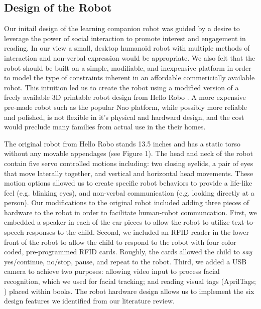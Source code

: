 \documentclass{sigchi}
\begin{document}
\subsection{Design of the Robot}
Our initail design of the learning companion robot was guided by a desire to leverage the power of social interaction to promote interest and engagement in reading.  In our view a small, desktop humanoid robot with multiple methods of interaction and non-verbal expression would be appropriate.  We also felt that the robot should be built on a simple, modifiable, and inexpensive platform in order to model the type of constraints inherent in an affordable commericially available robot.  This intuition led us to create the robot using a modified version of a freely available 3D printable robot design from Hello Robo \cite{Robo:2016}.  A more expensive pre-made robot such as the popular Nao platform, while possibly more reliable and polished, is not flexible in it's physical and hardward design, and the cost would preclude many families from actual use in the their homes.  

The original robot from Hello Robo stands 13.5 inches and has a static torso without any movable appendages (see Figure 1).  The head and neck of the robot contain five servo controlled motions including: two closing eyelids, a pair of eyes that move laterally together, and vertical and horizontal head movements.  These motion options allowed us to create specific robot behaviors to provide a life-like feel (e.g. blinking eyes), and non-verbal communication (e.g. looking directly at a person).  Our modifications to the original robot included adding three pieces of hardware to the robot in order to facilitate human-robot communcation. First, we embedded a speaker in each of the ear pieces to allow the robot to utilize text-to-speech responses to the child.  Second, we included an RFID reader in the lower front of the robot to allow the child to respond to the robot with four color coded, pre-programmed RFID cards.  Roughly, the cards allowed the child to \textit{say} yes/continue, no/stop, pause, and repeat to the robot.  Third, we added a USB camera to achieve two purposes: allowing video input to process facial recognition, which we used for facial tracking; and reading visual tags (AprilTags; \cite{}) placed within books.  The robot hardware design allows us to implement the six design features we identified from our literature review.
\end{document}
